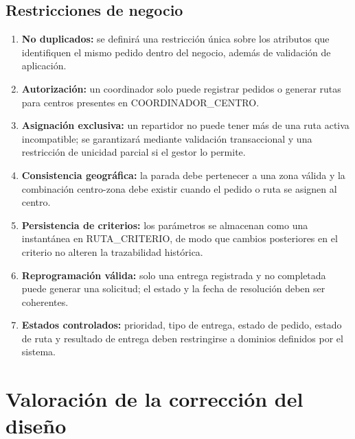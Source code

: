 \documentclass[12pt,a4paper]{article}
\begin{document}
\subsection{Restricciones de negocio}
\begin{enumerate}
\item \textbf{No duplicados:} se definirá una restricción única sobre los atributos que identifiquen el mismo pedido dentro del negocio, además de validación de aplicación.
\item \textbf{Autorización:} un coordinador solo puede registrar pedidos o generar rutas para centros presentes en COORDINADOR\_CENTRO.
\item \textbf{Asignación exclusiva:} un repartidor no puede tener más de una ruta activa incompatible; se garantizará mediante validación transaccional y una restricción de unicidad parcial si el gestor lo permite.
\item \textbf{Consistencia geográfica:} la parada debe pertenecer a una zona válida y la combinación centro-zona debe existir cuando el pedido o ruta se asignen al centro.
\item \textbf{Persistencia de criterios:} los parámetros se almacenan como una instantánea en RUTA\_CRITERIO, de modo que cambios posteriores en el criterio no alteren la trazabilidad histórica.
\item \textbf{Reprogramación válida:} solo una entrega registrada y no completada puede generar una solicitud; el estado y la fecha de resolución deben ser coherentes.
\item \textbf{Estados controlados:} prioridad, tipo de entrega, estado de pedido, estado de ruta y resultado de entrega deben restringirse a dominios definidos por el sistema.
\end{enumerate}

\section{Valoración de la corrección del diseño}
\end{document}
